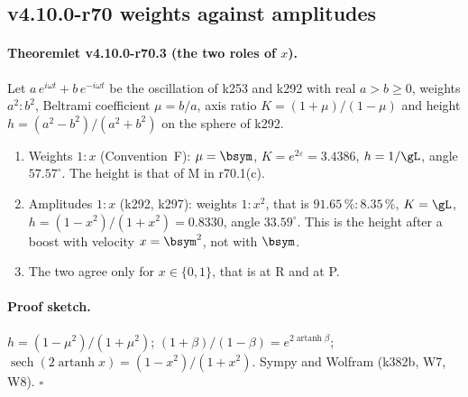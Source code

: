 \subsection*{v4.10.0-r70 weights against amplitudes}
\label{subsec:v4100-r70-weights}

\paragraph{Theoremlet v4.10.0-r70.3 (the two roles of \(x\)).}
Let \(a\,e^{i\omega t}+b\,e^{-i\omega t}\) be the oscillation of k253 and k292 with real \(a>b\ge0\), weights \(a^2:b^2\), Beltrami coefficient
\(\mu=b/a\), axis ratio \(K=(1+\mu)/(1-\mu)\) and height \(h=(a^2-b^2)/(a^2+b^2)\) on the sphere of k292.
\begin{enumerate}[leftmargin=2em]
\item[(a)] Weights \(1:x\) (Convention~F): \(\mu=\bsym\), \(K=e^{2\varepsilon}=3.4386\), \(h=1/\gL\), angle \(57.57^\circ\).  The height is that of
M in r70.1(c).
\item[(b)] Amplitudes \(1:x\) (k292, k297): weights \(1:x^2\), that is \(91.65\,\%:8.35\,\%\), \(K=\gL\), \(h=(1-x^2)/(1+x^2)=0.8330\), angle
\(33.59^\circ\).  This is the height after a boost with velocity \(x=\bsym^2\), not with \(\bsym\).
\item[(c)] The two agree only for \(x\in\{0,1\}\), that is at R and at P.
\end{enumerate}

\paragraph{Proof sketch.}
\(h=(1-\mu^2)/(1+\mu^2)\); \((1+\beta)/(1-\beta)=e^{2\operatorname{artanh}\beta}\); \(\operatorname{sech}(2\operatorname{artanh}x)=(1-x^2)/(1+x^2)\).
Sympy and Wolfram (k382b, W7, W8).  \(\square\)

